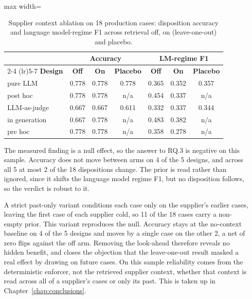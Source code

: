 \begin{table}[htb]
\centering
\caption{Supplier context ablation on 18 production cases: disposition accuracy and language model-regime F1 across retrieval off, on (leave-one-out) and placebo.}
\label{tab:rag_ablation}
\footnotesize
\begin{adjustbox}{max width=\textwidth}
\begin{tabular}{@{}lcccccc@{}}
\toprule
& \multicolumn{3}{c}{\textbf{Accuracy}} & \multicolumn{3}{c}{\textbf{LM-regime F1}} \\
\cmidrule(lr){2-4} \cmidrule(lr){5-7}
\textbf{Design} & \textbf{Off} & \textbf{On} & \textbf{Placebo} & \textbf{Off} & \textbf{On} & \textbf{Placebo} \\
\midrule
pure LLM      & 0.778 & 0.778 & 0.778 & 0.365 & 0.352 & 0.357 \\
post hoc      & 0.778 & 0.778 & n/a   & 0.454 & 0.337 & n/a   \\
LLM-as-judge  & 0.667 & 0.667 & 0.611 & 0.332 & 0.337 & 0.344 \\
in generation & 0.667 & 0.778 & n/a   & 0.483 & 0.382 & n/a   \\
pre hoc       & 0.778 & 0.778 & n/a   & 0.358 & 0.278 & n/a   \\
\bottomrule
\end{tabular}
\end{adjustbox}
\end{table}

The measured finding is a null effect, so the answer to RQ.3 is negative on this sample. Accuracy does not move between arms on 4 of the 5 designs, and across all 5 at most 2 of the 18 dispositions change. The prior is read rather than ignored, since it shifts the language model regime F1, but no disposition follows, so the verdict is robust to it.

A strict past-only variant conditions each case only on the supplier's earlier cases, leaving the first case of each supplier cold, so 11 of the 18 cases carry a non-empty prior. This variant reproduces the null. Accuracy stays at the no-context baseline on 4 of the 5 designs and moves by a single case on the other 2, a net of zero flips against the off arm. Removing the look-ahead therefore reveals no hidden benefit, and closes the objection that the leave-one-out result masked a real effect by drawing on future cases. On this sample reliability comes from the deterministic enforcer, not the retrieved supplier context, whether that context is read across all of a supplier's cases or only its past. This is taken up in Chapter~\ref{chap:conclusions}.


